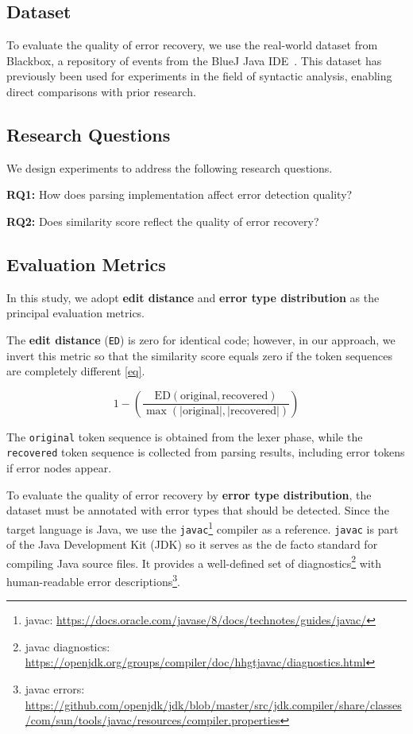\documentclass[conference]{IEEEtran}
\begin{document}
\subsection{Dataset}
To evaluate the quality of error recovery, we use the real-world dataset from Blackbox, a repository of events from the BlueJ Java IDE~\cite{bluej}. This dataset has previously been used for experiments in the field of syntactic analysis\cite{panic,ai_recovery, ide-errors}, enabling direct comparisons with prior research.

\subsection{Research Questions}
We design experiments to address the following research questions.

\textbf{RQ1:} How does parsing implementation affect error detection quality?

\textbf{RQ2:} Does similarity score reflect the quality of error recovery?

\subsection{Evaluation Metrics}
In this study, we adopt \textbf{edit distance} and \textbf{error type distribution} as the principal evaluation metrics. 

The \textbf{edit distance} (\texttt{ED}) is zero for identical code; however, in our approach, we invert this metric so that the similarity score equals zero if the token sequences are completely different \eqref{eq}.

\begin{equation}
 1 - \left( \frac{\text{ED}(\text{original}, \text{recovered})}{\max(|\text{original}|, |\text{recovered}|)} \right)\label{eq}
\end{equation}

 The \texttt{original} token sequence is obtained from the lexer phase, while the \texttt{recovered} token sequence is collected from parsing results, including error tokens if error nodes appear.


To evaluate the quality of error recovery by \textbf{error type distribution}, the dataset must be annotated with error types that should be detected. Since the target language is Java, we use the \texttt{javac}\footnote{javac: \url{https://docs.oracle.com/javase/8/docs/technotes/guides/javac/}} compiler as a reference. \texttt{javac} is part of the Java Development Kit (JDK) so it serves as the de facto standard for compiling Java source files. It provides a well-defined set of diagnostics\footnote{javac diagnostics: \\ \url{https://openjdk.org/groups/compiler/doc/hhgtjavac/diagnostics.html}} with human-readable error descriptions\footnote{javac errors: \url{https://github.com/openjdk/jdk/blob/master/src/jdk.compiler/share/classes/com/sun/tools/javac/resources/compiler.properties}}.
\end{document}

